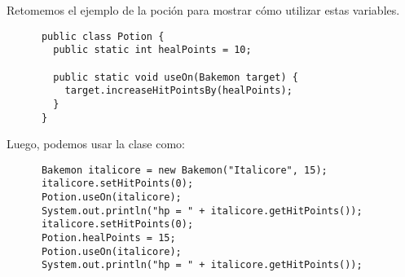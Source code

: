     Retomemos el ejemplo de la poción para mostrar cómo utilizar estas variables.

    \begin{verbatim}
      public class Potion {
        public static int healPoints = 10;

        public static void useOn(Bakemon target) {
          target.increaseHitPointsBy(healPoints);
        }
      }
    \end{verbatim}

    Luego, podemos usar la clase como:
    \begin{verbatim}
      Bakemon italicore = new Bakemon("Italicore", 15);
      italicore.setHitPoints(0);
      Potion.useOn(italicore);
      System.out.println("hp = " + italicore.getHitPoints());
      italicore.setHitPoints(0);
      Potion.healPoints = 15;
      Potion.useOn(italicore);
      System.out.println("hp = " + italicore.getHitPoints());
    \end{verbatim}
